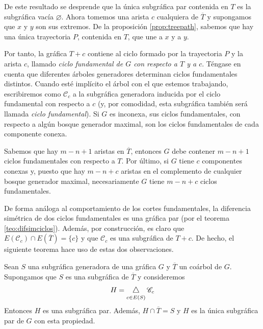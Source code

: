 De este resultado se desprende que la única subgráfica par contenida en $T$ es la subgráfica vacía $\varnothing$. Ahora tomemos una arista $c$ cualquiera  de $\overline{T}$ y supongamos que $x$ y $y$ son sus extremos. De la proposición \ref{prop:treepath}, sabemos que hay una única trayectoria $P$, contenida en $T$, que une a $x$ y a $y$. 

Por tanto, la gráfica $T + c$ contiene al ciclo formado por la trayectoria $P$ y la arista $c$, llamado \textit{ciclo fundamental de $G$ con respecto a $T$ y a $c$}. Téngase en cuenta que diferentes árboles generadores determinan ciclos fundamentales distintos. Cuando esté implícito el árbol con el que estemos trabajando, escribiremos como $\mathscr{C}_{c}$ a la subgráfica generadora inducida por el ciclo fundamental con respecto a $c$ (y, por comodidad, esta subgráfica también será llamada \textit{ciclo fundamental}). Si $G$ es inconexa, sus ciclos fundamentales, con respecto a algún bosque generador maximal, son los ciclos fundamentales de cada componente conexa. 

Sabemos que hay $m - n + 1$ aristas en $\overline{T}$, entonces $G$ debe contener $m - n +1$ ciclos fundamentales con respecto a $T$.  Por último, si $G$ tiene $c$ componentes conexas y, puesto que hay $m - n + c$ aristas en el complemento de cualquier bosque generador maximal, necesariamente $G$ tiene $m-n+c$ ciclos fundamentales.

De forma análoga al comportamiento de los cortes fundamentales, la diferencia simétrica de dos ciclos fundamentales es una gráfica par (por el teorema \ref{teo:difsimciclos}). Además, por construcción, es claro que $E(\mathscr{C}_{c}) \cap E(\overline{T}) = \{c\}$ y que $\mathscr{C}_{c}$ es una subgráfica de $T + c$. De hecho, el siguiente teorema hace uso de estas dos observaciones.

\begin{lema} \label{ciclosfundamentalespropchida}
Sean $S$ una subgráfica generadora de una gráfica $G$ y $\overline{T}$ un coárbol de $G$. Supongamos que $S$ es una subgráfica de $\overline{T}$ y consideremos  
$$
H =\difsym_{c \in E(S)} \mathscr{C}_{c} 
$$
 Entonces $H$ es una subgráfica par. Además, $H \cap \overline{T} = S$ y $H$ es la única subgráfica par de $G$ con esta propiedad.
\end{lema}
 
